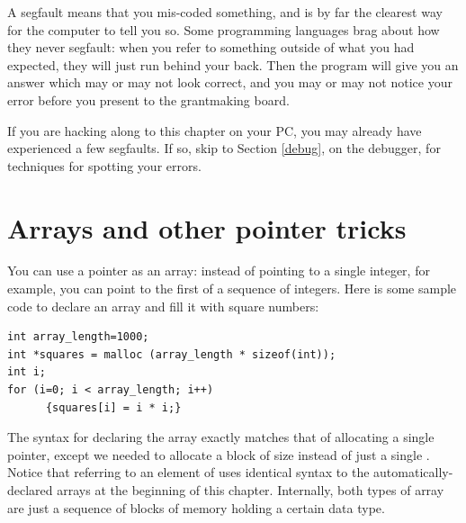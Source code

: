 A segfault means that you mis-coded something, and 
is by far the clearest way for the computer to tell you so. Some
programming languages
brag about how they never segfault: when you refer to something
outside of what you had expected, they will just
run  behind your
back. Then the program will give you an answer which may or may not look
correct, and you may or may not notice your error before you present to the
grantmaking board. 

If you are hacking along to this chapter on your PC, you may already
have experienced a few segfaults. If so, skip to 
Section \ref{debug}, on the debugger, for techniques for spotting your
errors.


\section{Arrays and other pointer tricks} \label{for_loops} 
You can use a pointer as an array: instead of pointing to a single
integer, for example, you can point to the first of a sequence of
integers. Here is some sample code to declare an array and fill it with square numbers:
\begin{lstlisting}
int array_length=1000;
int *squares = malloc (array_length * sizeof(int));
int i;
for (i=0; i < array_length; i++)
      {squares[i] = i * i;}
\end{lstlisting}

The syntax for declaring the array exactly match\-es that of allocating
a single pointer, except we need\-ed to allocate a block of size 
 instead of just a single . 
Notice that referring to an element of  uses identical syntax to the 
automatically-declared arrays at the beginning of this chapter.
Internally, both types of array are just a sequence of blocks of memory holding a certain
data type. 

